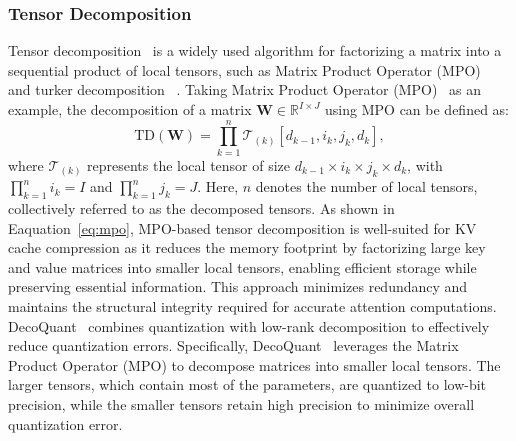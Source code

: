 \subsubsection{Tensor Decomposition}\label{sssec:kv_low_rank_tensor}
Tensor decomposition~\cite{kuleshov2015tensor, zhou2017tensor,haeffele2015global} is a widely used algorithm for factorizing a matrix into a sequential product of local tensors, such as Matrix Product Operator (MPO)~\cite{liu2021enabling} and turker decomposition~\cite{malik2018low} .
Taking Matrix Product Operator (MPO)~\cite{liu2021enabling} as an example, the decomposition of a matrix $\mathbf{W} \in \mathbb{R}^{I \times J}$ using MPO can be  defined as:
\begin{equation}\label{eq:mpo}
    \text{TD}(\mathbf{W}) = \prod_{k=1}^n \mathcal{T}_{(k)}[d_{k-1}, i_k, j_k, d_k],
\end{equation}
where $\mathcal{T}_{(k)}$ represents the local tensor of size $d_{k-1} \times i_k \times j_k \times d_k$, with $\prod_{k=1}^n i_k = I$ and $\prod_{k=1}^n j_k = J$. Here, $n$ denotes the number of local tensors, collectively referred to as the decomposed tensors.
As shown in Eaquation~\eqref{eq:mpo},
MPO-based tensor decomposition is well-suited for KV cache compression as it reduces the memory footprint by factorizing large key and value matrices into smaller local tensors, enabling efficient storage while preserving essential information. This approach minimizes redundancy and maintains the structural integrity required for accurate attention computations.
DecoQuant~\cite{liu2024unlocking} combines quantization with low-rank decomposition to effectively reduce quantization errors. Specifically, DecoQuant~\cite{liu2024unlocking} leverages the Matrix Product Operator (MPO) to decompose matrices into smaller local tensors. The larger tensors, which contain most of the parameters, are quantized to low-bit precision, while the smaller tensors retain high precision to minimize overall quantization error.

